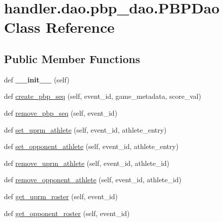 \hypertarget{classhandler_1_1dao_1_1pbp__dao_1_1_p_b_p_dao}{}\section{handler.\+dao.\+pbp\+\_\+dao.\+P\+B\+P\+Dao Class Reference}
\label{classhandler_1_1dao_1_1pbp__dao_1_1_p_b_p_dao}
\subsection*{Public Member Functions}
\begin{DoxyCompactItemize}
\item 
\mbox{\label{classhandler_1_1dao_1_1pbp__dao_1_1_p_b_p_dao_aed87d702c45ef76295f6e1c4f4bba7f6}} 
def {\bfseries \+\_\+\+\_\+init\+\_\+\+\_\+} (self)
\item 
def \hyperlink{classhandler_1_1dao_1_1pbp__dao_1_1_p_b_p_dao_ab5691fa252a6c95475ce1177e8524e58}{create\+\_\+pbp\+\_\+seq} (self, event\+\_\+id, game\+\_\+metadata, score\+\_\+val)
\item 
def \hyperlink{classhandler_1_1dao_1_1pbp__dao_1_1_p_b_p_dao_a6c920f35c66c135f03d4bc973396d1a1}{remove\+\_\+pbp\+\_\+seq} (self, event\+\_\+id)
\item 
def \hyperlink{classhandler_1_1dao_1_1pbp__dao_1_1_p_b_p_dao_a9796b031f3f16f8edd59b6b52ed18a39}{set\+\_\+uprm\+\_\+athlete} (self, event\+\_\+id, athlete\+\_\+entry)
\item 
def \hyperlink{classhandler_1_1dao_1_1pbp__dao_1_1_p_b_p_dao_a8fb43c276529f4747419d30551badba7}{set\+\_\+opponent\+\_\+athlete} (self, event\+\_\+id, athlete\+\_\+entry)
\item 
def \hyperlink{classhandler_1_1dao_1_1pbp__dao_1_1_p_b_p_dao_a8f5c7ee21ed3fb4536bf421c000248c8}{remove\+\_\+uprm\+\_\+athlete} (self, event\+\_\+id, athlete\+\_\+id)
\item 
def \hyperlink{classhandler_1_1dao_1_1pbp__dao_1_1_p_b_p_dao_a718cce233b89bd71d05297802ca68686}{remove\+\_\+opponent\+\_\+athlete} (self, event\+\_\+id, athlete\+\_\+id)
\item 
def \hyperlink{classhandler_1_1dao_1_1pbp__dao_1_1_p_b_p_dao_aaad531a52c756adac0a37ff83ee512e0}{get\+\_\+uprm\+\_\+roster} (self, event\+\_\+id)
\item 
def \hyperlink{classhandler_1_1dao_1_1pbp__dao_1_1_p_b_p_dao_a528c269edcf0f3aaaa3a16865091a686}{get\+\_\+opponent\+\_\+roster} (self, event\+\_\+id)

\end{DoxyCompactItemize}
